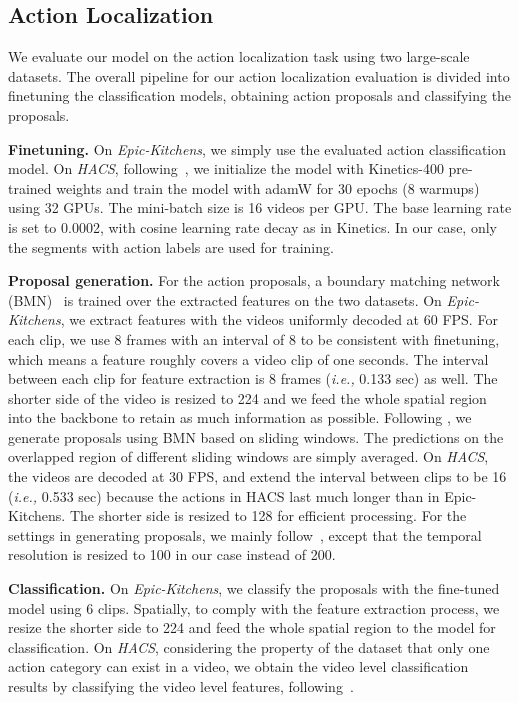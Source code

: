 \documentclass{article} \usepackage{iclr2022_conference,times}
\begin{document}
\subsection{Action Localization}
We evaluate our model on the action localization task using two large-scale datasets. 
The overall pipeline for our action localization evaluation is divided into finetuning the classification models, obtaining action proposals and classifying the proposals.

\textbf{Finetuning. }On \textit{Epic-Kitchens}, we simply use the evaluated action classification model. On \textit{HACS}, following~\citep{hacscompetition}, we initialize the model with Kinetics-400 pre-trained weights and train the model with adamW for 30 epochs (8 warmups) using 32 GPUs. 
The mini-batch size is 16 videos per GPU. 
The base learning rate is set to 0.0002, with cosine learning rate decay as in Kinetics.
In our case, only the segments with action labels are used for training.

\textbf{Proposal generation.} 
For the action proposals, a boundary matching network (BMN)~\citep{bmn} is trained over the extracted features on the two datasets. 
On \textit{Epic-Kitchens}, we extract features with the videos uniformly decoded at 60 FPS. 
For each clip, we use 8 frames with an interval of 8 to be consistent with finetuning, which means a feature roughly covers a video clip of one seconds. 
The interval between each clip for feature extraction is 8 frames (\textit{i.e.,} 0.133 sec) as well.
The shorter side of the video is resized to 224 and we feed the whole spatial region into the backbone to retain as much information as possible.
Following \citet{ek100actionlocalization}, we generate proposals using BMN based on sliding windows.
The predictions on the overlapped region of different sliding windows are simply averaged.
On \textit{HACS}, the videos are decoded at 30 FPS, and extend the interval between clips to be 16 (\textit{i.e.,} 0.533 sec) because the actions in HACS last much longer than in Epic-Kitchens. 
The shorter side is resized to 128 for efficient processing. 
For the settings in generating proposals, we mainly follow~\citet{hacscompetition}, except that the temporal resolution is resized to 100 in our case instead of 200.

\textbf{Classification. }On \textit{Epic-Kitchens}, we classify the proposals with the fine-tuned model using 6 clips. Spatially, to comply with the feature extraction process, we resize the shorter side to 224 and feed the whole spatial region to the model for classification.
On \textit{HACS}, considering the property of the dataset that only one action category can exist in a video, we obtain the video level classification results by classifying the video level features, following~\citet{hacscompetition}.
\end{document}
